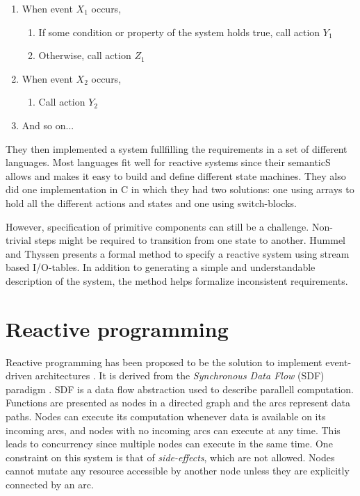 \begin{enumerate}
\item
  When event $X_1$ occurs,
\begin{enumerate}
\item
  If some condition or property of the system holds true, call action $Y_1$
\item
  Otherwise, call action $Z_1$
\end{enumerate}

\item
  When event $X_2$ occurs,
\begin{enumerate}
\item
  Call action $Y_2$
\end{enumerate}

\item
  And so on...
\end{enumerate}

They then implemented a system fullfilling the requirements in a set of
different languages. Most languages fit well for reactive systems since their
semanticS allows and makes it easy to build and define different state
machines.  They also did one implementation in C in which they had two
solutions: one using arrays to hold all the different actions and states and
one using switch-blocks.

However, specification of primitive components can still be a challenge.
Non-trivial steps might be required to transition from one state to another.
Hummel and Thyssen \cite{hummel2009behavioral} presents a formal method to
specify a reactive system using stream based I/O-tables. In addition to
generating a simple and understandable description of the system, the method
helps formalize inconsistent requirements.

\section{Reactive programming}

Reactive programming has been proposed to be the solution to implement
event-driven architectures \cite{bainomugisha2013survey}. It is derived from
the \textit{Synchronous Data Flow} (SDF) paradigm \cite{lee1987synchronous}.
SDF is a data flow abstraction used to describe parallell computation.
Functions are presented as nodes in a directed graph and the arcs represent
data paths. Nodes can execute its computation whenever data is available on its
incoming arcs, and nodes with no incoming arcs can execute at any time. This
leads to concurrency since multiple nodes can execute in the same time. One
constraint on this system is that of \textit{side-effects}, which are not
allowed. Nodes cannot mutate any resource accessible by another node unless
they are explicitly connected by an arc.


